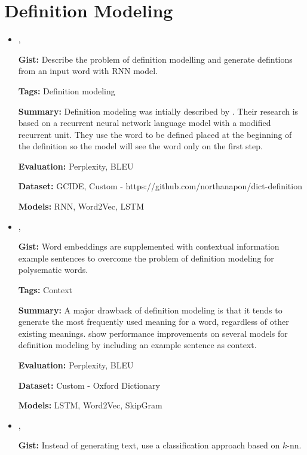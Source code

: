 \documentclass{article}[a4paper]
\newcommand{\bitem}[2]{
    \item[\cite{#1}]
        \textbf{\citetitle{#1}}

        \citeauthor{#1}, \citeyear{#1}
        \newline\newline
        {#2}
}%
\begin{document}
\tableofcontents

\section{Definition Modeling}
\begin{itemize}
    \bitem{noraset_definition_2016}%
    {%
        \textbf{Gist:}
        Describe the problem of definition modelling and generate defintions
        from an input word with RNN model.

        \textbf{Tags:}
        Definition modeling

        \textbf{Summary:}
        Definition modeling was intially described by
        \citeauthor{noraset_definition_2016}. Their research is based on a
        recurrent neural network language model \cite{mikolov_recurrent_2010}
        with a modified recurrent unit. They use the word to be defined placed
        at the beginning of the definition so the model will see the word only
        on the first step.

        \textbf{Evaluation:}
        Perplexity, BLEU

        \textbf{Dataset:}
        GCIDE,
        Custom - https://github.com/northanapon/dict-definition

        \textbf{Models:}
        RNN, Word2Vec, LSTM
    }%

    \bitem{gadetsky_conditional_2018}%
    {%
        \textbf{Gist:}
        Word embeddings are supplemented with contextual information example
        sentences to overcome the problem of definition modeling for polysematic
        words.

        \textbf{Tags:}
        Context

        \textbf{Summary:}
        A major drawback of definition modeling \cite{noraset_definition_2016}
        is that it tends to generate the most frequently used meaning for a
        word, regardless of other existing meanings.
        \citeauthor{gadetsky_conditional_2018} show performance improvements on
        several models for definition modeling by including an example sentence
        as context.

        \textbf{Evaluation:}
        Perplexity, BLEU

        \textbf{Dataset:}
        Custom - Oxford Dictionary

        \textbf{Models:}
        LSTM, Word2Vec, SkipGram
    }%

    \bitem{chang_what_2019}%
    {%
        \textbf{Gist:}
        Instead of generating text, use a classification approach based on
        $k$-nn.

}
\end{itemize}
\end{document}
